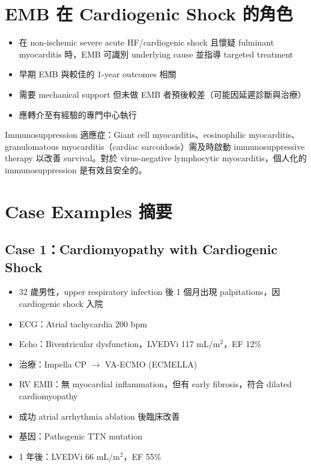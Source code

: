\documentclass[12pt,a4paper]{article}
\newcommand{\note}[1]{
    \par
    \noindent
    \begin{tcolorbox}[
        colback=emergency_blue!5!white,
        colframe=emergency_blue,
        title=\textbf{重點提醒},
        fonttitle=\bfseries,
        boxrule=0.5pt,
        arc=3pt,
        left=6pt,
        right=6pt,
        top=6pt,
        bottom=6pt
    ]
    #1
    \end{tcolorbox}
}
\begin{document}
\section{EMB 在 Cardiogenic Shock 的角色}

\begin{itemize}
    \item 在 non-ischemic severe acute HF/cardiogenic shock 且懷疑 fulminant myocarditis 時，EMB 可識別 underlying cause 並指導 targeted treatment
    \item 早期 EMB 與較佳的 1-year outcomes 相關
    \item 需要 mechanical support 但未做 EMB 者預後較差（可能因延遲診斷與治療）
    \item 應轉介至有經驗的專門中心執行
\end{itemize}

\note{
Immunosuppression 適應症：Giant cell myocarditis、eosinophilic myocarditis、granulomatous myocarditis（cardiac sarcoidosis）需及時啟動 immunosuppressive therapy 以改善 survival。對於 virus-negative lymphocytic myocarditis，個人化的 immunosuppression 是有效且安全的。
}

\section{Case Examples 摘要}

\subsection{Case 1：Cardiomyopathy with Cardiogenic Shock}

\begin{itemize}
    \item 32 歲男性，upper respiratory infection 後 1 個月出現 palpitations，因 cardiogenic shock 入院
    \item ECG：Atrial tachycardia 200 bpm
    \item Echo：Biventricular dysfunction，LVEDVi 117 mL/m$^2$，EF 12\%
    \item 治療：Impella CP $\rightarrow$ VA-ECMO (ECMELLA)
    \item RV EMB：無 myocardial inflammation，但有 early fibrosis，符合 dilated cardiomyopathy
    \item 成功 atrial arrhythmia ablation 後臨床改善
    \item 基因：Pathogenic TTN mutation
    \item 1 年後：LVEDVi 66 mL/m$^2$，EF 55\%
\end{itemize}
\end{document}

